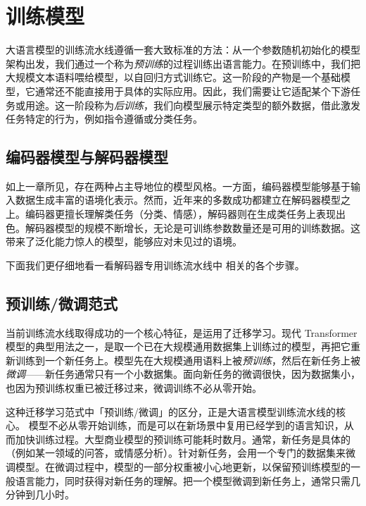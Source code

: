 \section{训练模型}

大语言模型的训练流水线遵循一套大致标准的方法：从一个参数随机初始化的模型架构出发，我们通过一个称为{\em 预训练}的过程训练出语言能力。在预训练中，我们把大规模文本语料喂给模型，以自回归方式训练它。这一阶段的产物是一个基础模型，它通常还不能直接用于具体的实际应用。因此，我们需要让它适配某个下游任务或用途。这一阶段称为{\em 后训练}，我们向模型展示特定类型的额外数据，借此激发任务特定的行为，例如指令遵循或分类任务。

\subsection{编码器模型与解码器模型}
如上一章所见，存在两种占主导地位的模型风格。一方面，编码器模型能够基于输入数据生成丰富的语境化表示。然而，近年来的多数成功都建立在解码器模型之上。编码器更擅长理解类任务（分类、情感），解码器则在生成类任务上表现出色。解码器模型的规模不断增长，无论是可训练参数数量还是可用的训练数据。这带来了泛化能力惊人的模型，能够应对未见过的语境。

下面我们更仔细地看一看解码器专用训练流水线中%
相关的各个步骤。


\subsection{预训练/微调范式}


当前训练流水线取得成功的一个核心特征，是运用了迁移学习。现代 Transformer 模型的典型用法之一，是取一个已在大规模通用数据集上训练过的模型，再把它重新训练到一个新任务上。模型先在大规模通用语料上被{\em 预训练}，然后在新任务上被{\em 微调}——新任务通常只有一个小数据集。面向新任务的微调很快，因为数据集小，也因为预训练权重已被迁移过来，微调训练不必从零开始。


这种迁移学习范式中「预训练/微调」的区分，正是大语言模型训练流水线的核心。
模型不必从零开始训练，而是可以在新场景中复用已经学到的语言知识，从而加快训练过程。大型商业模型的预训练可能耗时数月。通常，新任务是具体的（例如某一领域的问答，或情感分析）。针对新任务，会用一个专门的数据集来微调模型。在微调过程中，模型的一部分权重被小心地更新，以保留预训练模型的一般语言能力，同时获得对新任务的理解。把一个模型微调到新任务上，通常只需几分钟到几小时。


